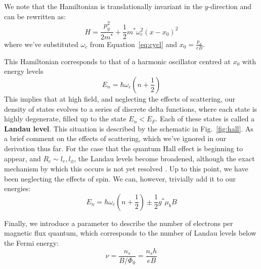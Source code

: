 We note that the Hamiltonian is translationally invariant in the $y$-direction and can be rewritten as:
\begin{equation}
  H = \frac{p_y^2}{2m^*} + \frac{1}{2}m^*\omega_c^2(x - x_0)^2
\end{equation}
where we've substituted $\omega_c$ from Equation~\ref{eq:cycl} and $x_0 = \tfrac{p_x}{eB}$.

This Hamiltonian corresponds to that of a harmonic oscillator centred at $x_0$ with energy levels
\begin{equation}
  E_n = \hbar \omega_c\left(n + \frac{1}{2}\right)
\end{equation}
This implies that at high field, and neglecting the effects of scattering, our density of states evolves to
a series of discrete delta functions, where each state is highly degenerate, filled up to the state $E_n < E_F$.
Each of these states is called a \textbf{Landau level}. This situation is described by the schematic in Fig.~\ref{fig:hall}.
As a brief comment on the effects of scattering, which we've ignored in our derivation thus far. For the case that the quantum Hall effect is beginning to appear, and $R_c \sim l_e, l_\phi$, the Landau levels become broadened, although the exact mechanism
by which this occurs is not yet resolved \cite{PhysRevB.90.035425, PhysRevB.82.075401}. Up to this point,
we have been neglecting the effects of spin. We can, however, trivially add it to our energies:
\begin{equation}
  E_n = \hbar \omega_c\left(n + \frac{1}{2}\right) \pm \frac{1}{2}g^* \mu_b B
\end{equation}

Finally, we introduce a parameter to describe the number of electrons per magnetic flux quantum, which corresponds
to the number of Landau levels below the Fermi energy:
\begin{equation}
  \nu = \frac{n_s}{B / \Phi_0} = \frac{n_s h}{e B}
  \label{eq:nu}
\end{equation}

